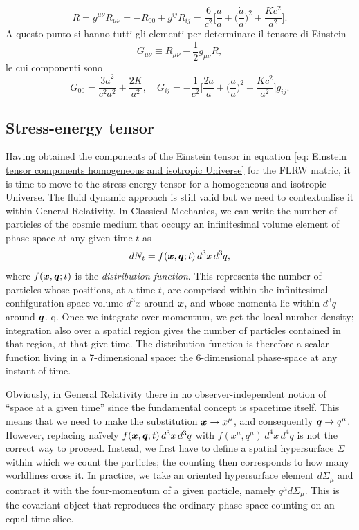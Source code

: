 \begin{equation}
    R = g^{\mu\nu}R_{\mu\nu} = -R_{00} + g^{ij}R_{ij} = \frac{6}{c^2}\bigg[\frac{\ddot{a}}{a} + \bigg(\frac{\dot{a}}{a}\bigg)^2 + \frac{Kc^2}{a^2}\bigg].
\end{equation}
A questo punto si hanno tutti gli elementi per determinare il tensore di Einstein
\begin{equation}
    G_{\mu\nu} \equiv R_{\mu\nu} - \frac{1}{2}g_{\mu\nu}R,
\end{equation}
le cui componenti sono 
\begin{equation}
\label{eq: Einstein tensor components homogeneous and isotropic Universe}
    G_{00} = \frac{3\dot{a}^2}{c^2a^2} + \frac{2K}{a^2},\quad G_{ij} = -\frac{1}{c^2}\bigg[\frac{2\ddot{a}}{a} + \bigg(\frac{\dot{a}}{a}\bigg)^2 + \frac{Kc^2}{a^2}\bigg]g_{ij}.
\end{equation}

\subsection{Stress-energy tensor}
Having obtained the components of the Einstein tensor in equation \eqref{eq: Einstein tensor components homogeneous and isotropic Universe} for the FLRW matric, it is time to move to the stress-energy tensor for a homogeneous and isotropic Universe. The fluid dynamic approach is still valid but we need to contextualise it within General Relativity. In Classical Mechanics, we can write the number of particles of the cosmic medium that occupy an infinitesimal volume element of phase-space at any given time $t$ as 
\begin{equation}
\label{eq: fundamental phase-space volume element in CM}
    dN_t = f(\bm{x},\bm{q};t)\,d^3x\,d^3q,
\end{equation}
where $f(\bm{x},\bm{q};t)$ is the \emph{distribution function}. This represents the number of particles whose positions, at a time $t$, are comprised within the infinitesimal confifguration-space volume $d^3x$ around $\bm{x}$, and whose momenta lie within $d^3q$ around $\bm{q}$. q. Once we integrate over momentum, we get the local number density; integration also over a spatial region gives the number of particles contained in that region, at that give time. The distribution function is therefore a scalar function living in a 7-dimensional space: the 6-dimensional phase-space at any instant of time.

Obviously, in General Relativity there in no observer-independent notion of ``space at a given time'' since the fundamental concept is spacetime itself. This means that we need to make the substitution $\bm{x} \to x^\mu$, and consequently $\bm{q} \to q^\mu$. However, replacing na\"ively $f(\bm{x},\bm{q};t)\,d^3x\,d^3q$ with $f(x^\mu,q^\mu)\,d^4x\,d^4q$ is not the correct way to proceed. Instead, we first have to define a spatial hypersurface $\Sigma$ within which we count the particles; the counting then corresponds to how many worldlines cross it. In practice, we take an oriented hypersurface element $d\Sigma_\mu$ and contract it with the four-momentum of a given particle, namely $q^\mu d\Sigma_\mu$. This is the covariant object that reproduces the ordinary phase-space counting on an equal-time slice.

